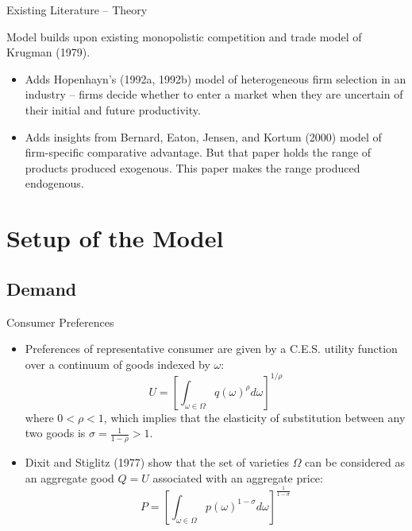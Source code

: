 \documentclass[aspectratio=169]{beamer}
\begin{document}

\begin{frame}{Existing Literature -- Theory}

Model builds upon existing monopolistic competition and trade model of Krugman (1979).

\begin{itemize}
    \item<1-> Adds Hopenhayn’s (1992a, 1992b) model of heterogeneous firm selection in an industry – firms decide whether to enter a market when they are uncertain of their initial and future productivity.
    \item<2-> Adds insights from Bernard, Eaton, Jensen, and Kortum (2000) model of firm-specific comparative advantage.  But that paper holds the range of products produced exogenous.  This paper makes the range produced endogenous.
\end{itemize}
    
\end{frame}


\section{Setup of the Model}

\subsection{Demand}


\begin{frame}{Consumer Preferences}

\begin{itemize}
    \item<1-> Preferences of representative consumer are given by a C.E.S. utility function over a continuum of goods indexed by $ \omega $:
    \begin{equation*}
        U = \left[ \int_{\omega \in \Omega} {q\left( \omega \right)^{\rho} d\omega} \right]^{1/\rho}
    \end{equation*}
    where $ 0 < \rho < 1 $, which implies that the elasticity of substitution between any two goods is $ \sigma = \frac{1}{1 - \rho} > 1 $.
    \item<2-> Dixit and Stiglitz (1977) show that the set of varieties $ \Omega $  can be considered as an aggregate good $ Q = U $ associated with an aggregate price:
    \begin{equation*}
        P = \left[ \int_{\omega \in \Omega} {p\left( \omega \right)^{1 - \sigma} d\omega} \right]^{\frac{1}{1 - \sigma}}
    \end{equation*}
\end{itemize}
    
\end{frame}
\end{document}

